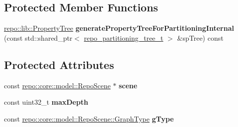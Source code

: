 \subsection*{Protected Member Functions}
\begin{DoxyCompactItemize}
\item 
\hypertarget{classrepo_1_1manipulator_1_1modelutility_1_1_abstract_spatial_partitioner_a712a25e95b83e7de662e2e92b9c931c2}{}\hyperlink{classrepo_1_1lib_1_1_property_tree}{repo\+::lib\+::\+Property\+Tree} {\bfseries generate\+Property\+Tree\+For\+Partitioning\+Internal} (const std\+::shared\+\_\+ptr$<$ \hyperlink{structrepo__partitioning__tree__t}{repo\+\_\+partitioning\+\_\+tree\+\_\+t} $>$ \&sp\+Tree) const \label{classrepo_1_1manipulator_1_1modelutility_1_1_abstract_spatial_partitioner_a712a25e95b83e7de662e2e92b9c931c2}

\end{DoxyCompactItemize}
\subsection*{Protected Attributes}
\begin{DoxyCompactItemize}
\item 
\hypertarget{classrepo_1_1manipulator_1_1modelutility_1_1_abstract_spatial_partitioner_acc5184e4cdcbded21d68bdfb661ce4c4}{}const \hyperlink{classrepo_1_1core_1_1model_1_1_repo_scene}{repo\+::core\+::model\+::\+Repo\+Scene} $\ast$ {\bfseries scene}\label{classrepo_1_1manipulator_1_1modelutility_1_1_abstract_spatial_partitioner_acc5184e4cdcbded21d68bdfb661ce4c4}

\item 
\hypertarget{classrepo_1_1manipulator_1_1modelutility_1_1_abstract_spatial_partitioner_a8f3d011aeb4f2b8c546cf8c470ac362e}{}const uint32\+\_\+t {\bfseries max\+Depth}\label{classrepo_1_1manipulator_1_1modelutility_1_1_abstract_spatial_partitioner_a8f3d011aeb4f2b8c546cf8c470ac362e}

\item 
\hypertarget{classrepo_1_1manipulator_1_1modelutility_1_1_abstract_spatial_partitioner_abc8b608e271174e8cb1ef539a2dfe80d}{}const \hyperlink{classrepo_1_1core_1_1model_1_1_repo_scene_aefcacd6eb4c7774ac1bfe3a6b223337c}{repo\+::core\+::model\+::\+Repo\+Scene\+::\+Graph\+Type} {\bfseries g\+Type}\label{classrepo_1_1manipulator_1_1modelutility_1_1_abstract_spatial_partitioner_abc8b608e271174e8cb1ef539a2dfe80d}

\end{DoxyCompactItemize}


